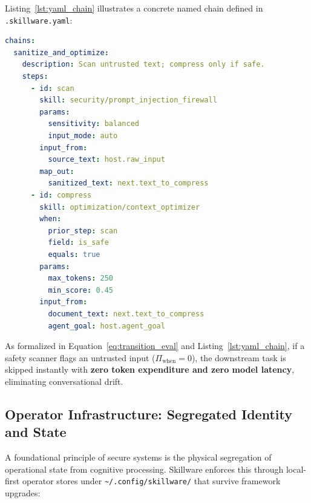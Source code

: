 Listing~\ref{lst:yaml_chain} illustrates a concrete named chain defined in \texttt{.skillware.yaml}:

\begin{lstlisting}[language=yaml, caption={Named skill chain in \texttt{.skillware.yaml} with dot-notation state bindings and conditional execution gates.}, label={lst:yaml_chain}]
chains:
  sanitize_and_optimize:
    description: Scan untrusted text; compress only if safe.
    steps:
      - id: scan
        skill: security/prompt_injection_firewall
        params:
          sensitivity: balanced
          input_mode: auto
        input_from:
          source_text: host.raw_input
        map_out:
          sanitized_text: next.text_to_compress
      - id: compress
        skill: optimization/context_optimizer
        when:
          prior_step: scan
          field: is_safe
          equals: true
        params:
          max_tokens: 250
          min_score: 0.45
        input_from:
          document_text: next.text_to_compress
          agent_goal: host.agent_goal
\end{lstlisting}

As formalized in Equation~\ref{eq:transition_eval} and Listing~\ref{lst:yaml_chain}, if a safety scanner flags an untrusted input ($\Pi_{\text{when}} = 0$), the downstream task is skipped instantly with \textbf{zero token expenditure and zero model latency}, eliminating conversational drift.

\subsection{Operator Infrastructure: Segregated Identity and State}
\label{subsec:operator_infrastructure}

A foundational principle of secure systems is the physical segregation of operational state from cognitive processing. Skillware enforces this through local-first operator stores under \texttt{\textasciitilde/.config/skillware/} that survive framework upgrades:

